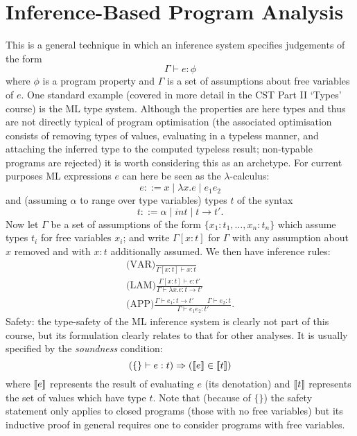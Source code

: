 \documentclass[twoside,a4paper,11pt]{article}
\newcommand{\db}[1]{{\bf [\![}#1{\bf ]\!]}}
\begin{document}
\section{Inference-Based Program Analysis}
This is a general technique in which an inference system specifies
judgements of the form
$$ \Gamma \vdash e:\phi$$
where $\phi$ is a program property and $\Gamma$ is a set of assumptions about
free variables of $e$.
One standard example (covered in more detail in the CST Part II `Types'
course) is the ML type system.  Although the properties are here types
and thus are not directly typical of program optimisation
(the associated optimisation consists of removing types of values,
evaluating in a typeless manner, and attaching the inferred type to the computed
typeless result; non-typable programs are rejected) it is worth considering
this as an archetype.
For current purposes ML expressions $e$ can here be seen
as the $\lambda$-calculus:
\[ e ::= x \mid \lambda x.e \mid e_1 e_2 \]
and (assuming $\alpha$ to range over type variables) types $t$ of the syntax
\[ t ::= \alpha \mid \mathit{int} \mid t \rightarrow t'. \]
Now let $\Gamma$ be a set of
assumptions of the form $\{x_1:t_1, \ldots, x_n:t_n\}$
which assume types $t_i$ for free variables $x_i$; and write $\Gamma[x:t]$
for $\Gamma$ with any assumption about $x$ removed and with $x:t$ additionally
assumed.
We then have inference rules:
\[ \begin{array}{c}
\displaystyle\mbox{(VAR)}\frac{}{\Gamma[x:t] \vdash x:t} \\[3ex]
\displaystyle\mbox{(LAM)}\frac{\Gamma[x:t] \vdash e:t'}
                     {\Gamma \vdash \lambda x.e:t\rightarrow t'} \\[3ex]
\displaystyle\mbox{(APP)}\frac{\Gamma \vdash e_1:t\rightarrow t'
                  \hspace{2em} \Gamma \vdash e_2:t}
                     {\Gamma \vdash e_1 e_2:t'}.
\end{array} \]
Safety: the type-safety of the ML inference system is clearly not part of
this course, but its formulation clearly relates to that for other analyses.
It is usually specified by the {\em soundness} condition:
\[ (\{\} \vdash e:t) \Rightarrow (\db{e} \in \db{t}) \]
where $\db{e}$ represents the result of evaluating $e$ (its denotation)
and $\db{t}$ represents the set of values which have type $t$.
Note that (because of $\{\}$) the safety statement only applies to closed
programs (those with no free variables) but its inductive proof in general
requires one to consider programs with free variables.
\end{document}
